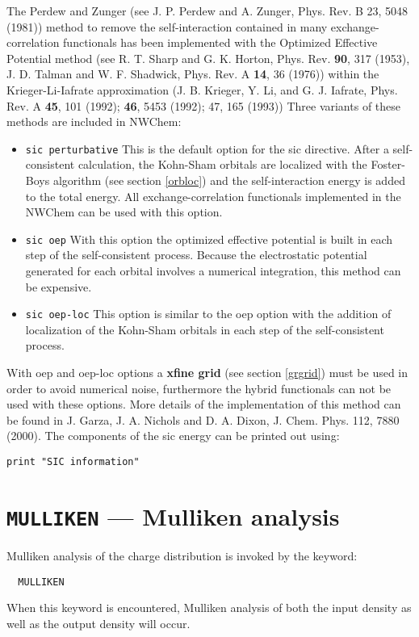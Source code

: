 The Perdew and Zunger (see J. P. Perdew and A. Zunger, Phys. Rev. B 23,
5048 (1981)) method to remove the self-interaction contained in many
exchange-correlation functionals has been implemented with the
Optimized Effective Potential method 
(see R. T. Sharp and G. K. Horton, Phys. Rev. {\bf 90}, 317 (1953),
J. D. Talman and W. F. Shadwick, Phys. Rev. A {\bf 14}, 36 (1976))
within the Krieger-Li-Iafrate approximation (J. B. Krieger, Y.  Li, 
and G. J. Iafrate, Phys. Rev. A {\bf 45}, 101 (1992); {\bf 46}, 5453 (1992); 
47, 165 (1993))
Three variants of these methods are included in NWChem:
\begin{itemize}
\item{\tt  sic perturbative} This is the default option for the sic
directive. After a self-consistent calculation, the Kohn-Sham
orbitals are localized with the Foster-Boys algorithm (see section
\ref{orbloc}) and the self-interaction energy is added to the total energy. 
All exchange-correlation functionals implemented in the NWChem can be
used with this option.
\item{\tt  sic oep} With this option the optimized effective potential is
built in each step of the self-consistent process. Because the electrostatic
potential generated for each orbital involves a numerical
integration, this method can be expensive.
\item{\tt  sic oep-loc} 
This option is similar to the oep option with the
addition of localization of the Kohn-Sham orbitals in each step of the 
self-consistent process.
\end{itemize}
With oep and oep-loc options a {\bf xfine grid} (see section \ref{grgrid})
must be used in order to avoid numerical noise, furthermore the hybrid 
functionals can not be used with these options.  More details of the
implementation of this method can be found in 
J. Garza, J. A. Nichols and D. A. Dixon, J. Chem. Phys. 112, 7880 (2000). 
The components of the sic energy can be printed out using:

\begin{verbatim}
print "SIC information"
\end{verbatim}


\section{{\tt MULLIKEN} --- Mulliken analysis}
Mulliken analysis of the charge distribution is invoked by the keyword:
\begin{verbatim}
  MULLIKEN
\end{verbatim}
When this keyword is encountered, Mulliken analysis of both the input 
density as well as the output density will occur.

